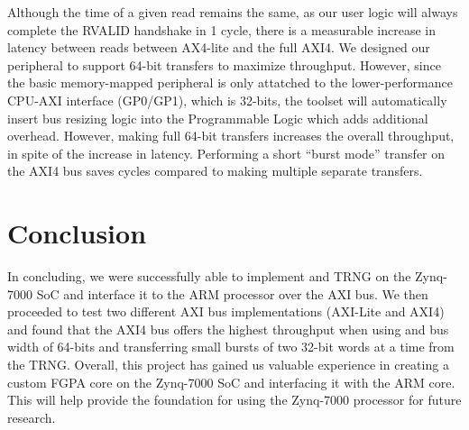 \documentclass[journal]{IEEEtran}
\begin{document}
Although the time of a given read remains the same, as our user logic will always complete the RVALID handshake in 1 cycle, there is a measurable increase in latency between reads between AX4-lite and the full AXI4. We designed our peripheral to support 64-bit transfers to maximize throughput. However, since the basic memory-mapped peripheral is only attatched to the lower-performance CPU-AXI interface (GP0/GP1), which is 32-bits, the toolset will automatically insert bus resizing logic into the Programmable Logic which adds additional overhead. However, making full 64-bit transfers increases the overall throughput, in spite of the increase in latency. Performing a short ``burst mode'' transfer on the AXI4 bus saves cycles compared to making multiple separate transfers. 

\section{Conclusion}

In concluding, we were successfully able to implement and TRNG on the Zynq-7000 SoC and interface it to the ARM processor over the AXI bus. We then proceeded to test two different AXI bus implementations (AXI-Lite and AXI4) and found that the AXI4 bus offers the highest throughput when using and bus width of 64-bits and transferring small bursts of two 32-bit words at a time from the TRNG. Overall, this project has gained us valuable experience in creating a custom FGPA core on the Zynq-7000 SoC and interfacing it with the ARM core. This will help provide the foundation for using the Zynq-7000 processor for future research. 






\end{document}
